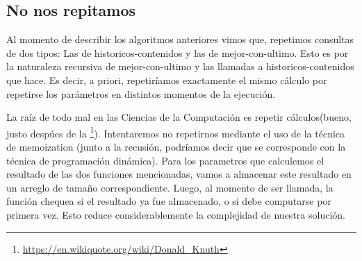 \subsection{No nos repitamos}
\par{Al momento de describir los algoritmos anteriores vimos que, repetimos consultas de dos tipos:
Las de historicos-contenidos y las de mejor-con-ultimo. Esto es por la naturaleza recursiva de mejor-con-ultimo y las llamadas a historicos-contenidos que hace. Es decir, a priori, repetiríamos exactamente el mismo cálculo por repetirse los parámetros en distintos momentos de la ejecución.} \newline
\par{La raíz de todo mal en las Ciencias de la Computación es repetir cálculos(bueno, justo despúes de la \footnote{\url{https://en.wikiquote.org/wiki/Donald_Knuth}}). Intentaremos no repetirnos mediante el uso de la técnica de memoization (junto a la recusión, podríamos decir que se corresponde con la técnica de programación dinámica). Para los parametros que calculemos el resultado de las dos funciones mencionadas, vamos a almacenar este resultado en un arreglo de tamaño correspondiente. Luego, al momento de ser llamada, la función chequea si el resultado ya fue almacenado, o si debe computarse por primera vez. Esto reduce considerablemente la complejidad de nuestra solución. } \newline
 

